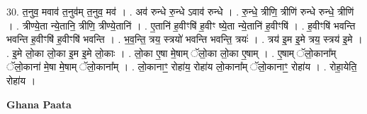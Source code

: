 \documentclass[17pt]{extarticle}
\begin{document}
30. त॒नुव॒ मवाव॑ त॒नुव॑म् त॒नुव॒ मव॑ । . अव॑ रुन्धे रु॒न्धे ऽवाव॑ रुन्धे । . रु॒न्धे॒ त्रीणि॒ त्रीणि॑ रुन्धे रुन्धे॒ त्रीणि॑ । . त्रीण्ये॒ता न्ये॒तानि॒ त्रीणि॒ त्रीण्ये॒तानि॑ । . ए॒तानि॑ ह॒वीꣳषि॑ ह॒वीꣳ ष्ये॒ता न्ये॒तानि॑ ह॒वीꣳषि॑ । . ह॒वीꣳषि॑ भवन्ति भवन्ति ह॒वीꣳषि॑ ह॒वीꣳषि॑ भवन्ति । . भ॒व॒न्ति॒ त्रय॒ स्त्रयो॑ भवन्ति भवन्ति॒ त्रयः॑ । . त्रय॑ इ॒म इ॒मे त्रय॒ स्त्रय॑ इ॒मे । . इ॒मे लो॒का लो॒का इ॒म इ॒मे लो॒काः । . लो॒का ए॒षा मे॒षाम् ॅलो॒का लो॒का ए॒षाम् । . ए॒षाम् ॅलो॒काना᳚म् ॅलो॒काना॑ मे॒षा मे॒षाम् ॅलो॒काना᳚म् । . लो॒कानाꣳ॒॒ रोहा॑य॒ रोहा॑य लो॒काना᳚म् ॅलो॒कानाꣳ॒॒ रोहा॑य । . रोहा॒येति॒ रोहा॑य । \newline

\textbf{Ghana Paata } \newline
\end{document}
